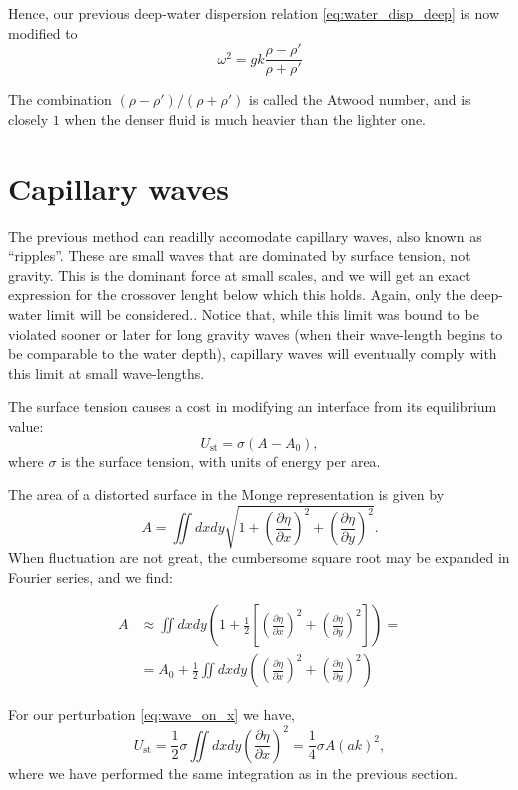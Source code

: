 Hence, our previous deep-water dispersion relation
\ref{eq:water_disp_deep} is now modified to
\[
\omega^2  =    g  k \frac{\rho-\rho'}{\rho + \rho'}
\]

The combination $(\rho-\rho')/(\rho + \rho')$ is called the Atwood
number, and is closely $1$ when the denser fluid is much heavier than
the lighter one.


\section{Capillary waves}

The previous method can readilly accomodate capillary
waves, also known as
``ripples''. These are small waves that are dominated
by surface tension, not gravity. This is the dominant force at small
scales, and we will get an exact expression for the crossover lenght
below which this holds. Again, only the deep-water limit will be
considered.. Notice that, while this limit was bound to be violated
sooner or later for long gravity waves (when their wave-length begins
to be comparable to the water depth), capillary waves will eventually
comply with this limit at small wave-lengths.


The surface tension causes a cost in modifying an interface from its
equilibrium value:
\[
U_\mathrm{st} = \sigma (A - A_0),
\]
where $\sigma$ is the surface tension, with units of energy per area.

The area of a distorted surface in the Monge representation is given by
\[
  A = \iint dx dy \sqrt{
    1 +
    \left( \frac{\partial \eta}{\partial x} \right)^2 +
    \left( \frac{\partial \eta}{\partial y} \right)^2
  } .
\]
When fluctuation are not great, the cumbersome square root may
be expanded in Fourier series, and we find:

\begin{align*}
  A & \approx \iint dx dy 
  \left(
    1 + \frac12 \left[
      \left( \frac{\partial \eta}{\partial x} \right)^2 +
      \left( \frac{\partial \eta}{\partial y} \right)^2
    \right]
      \right) = \\
  &= A_0 + \frac12
  \iint dx dy 
  \left(
      \left( \frac{\partial \eta}{\partial x} \right)^2 +
      \left( \frac{\partial \eta}{\partial y} \right)^2
    \right)  
\end{align*}

For our perturbation \ref{eq:wave_on_x} we have,
\[
U_\mathrm{st} = \frac12   \sigma  
  \iint dx dy 
  \left( \frac{\partial \eta}{\partial x} \right)^2  =
  \frac14 \sigma A (a k)^2 ,
\]
where we have performed the same integration as in the
previous section.

